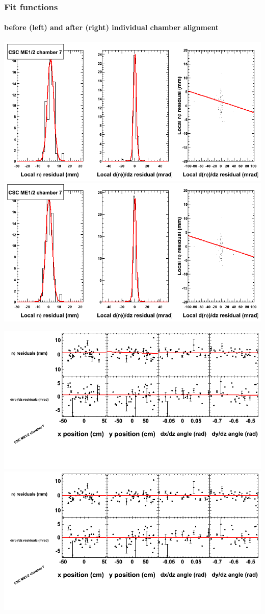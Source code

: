 \documentclass[compress]{beamer}
\begin{document}
\begin{frame}
\frametitle{Fit functions}
\framesubtitle{before (left) and after (right) individual chamber alignment}
\includegraphics[width=0.5\linewidth]{ringfits_3dof/beforefit_MEp12_07_bellcurve.png} \includegraphics[width=0.5\linewidth]{ringfits_3dof/afterfit_MEp12_07_bellcurve.png}

\includegraphics[width=0.5\linewidth]{ringfits_3dof/beforefit_MEp12_07_polynomials.png} \includegraphics[width=0.5\linewidth]{ringfits_3dof/afterfit_MEp12_07_polynomials.png}
\end{frame}
\end{document}
